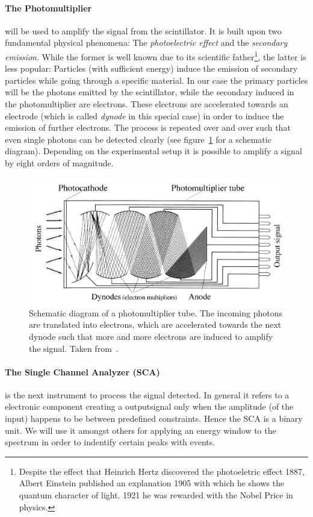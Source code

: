 \paragraph{The Photomultiplier}
will be used to amplify the signal from the scintillator. It is built upon
two fundamental physical phenomena: The \textit{photoelectric effect} and the \textit{secondary emission}. While the former
is well known due to its scientific father\footnote{Despite the effect that Heinrich Hertz discovered the 
photoeletric effect 1887, Albert Einstein published an explanation 1905 with which he shows the quantum character
of light. 1921 he was rewarded with the Nobel Price in physics.}, the latter is less popular: Particles (with
sufficient energy) induce the emission of secondary particles while going through a specific material. In
our case the primary particles will be the photons emitted by the scintillator, while the secondary induced
in the photomultiplier are electrons. These electrons are accelerated towards an electrode (which is called
\textit{dynode} in this special case) in order to induce the emission of further electrons. 
The process is repeated over and over such that even single photons can be detected clearly
(see figure~\ref{fig:photomultiplier} for a schematic diagram).
Depending on the experimental setup it is possible to amplify a signal by eight orders of magnitude. 
\begin{figure}[htpb]
    \centering
    \includegraphics[width=0.8\linewidth]{figures/photomultiplier}
    \caption{
        Schematic diagram of a photomultiplier tube. The incoming photons are translated into electrons, 
        which are accelerated towards the
        next dynode such that more and more electrons are induced to amplify the signal.
        Taken from~\cite{martin2006nuclear}. 
        }
    \label{fig:photomultiplier}
\end{figure}
\paragraph{The Single Channel Analyzer (SCA)} is the next instrument to process the signal detected. In general
it refers to a electronic component creating a outputsignal only when the amplitude (of the input) happens to be
between predefined constraints. Hence the SCA is a binary unit. We will use it amongst others for
applying an energy window to the spectrum in order to indentify certain peaks with events. 
